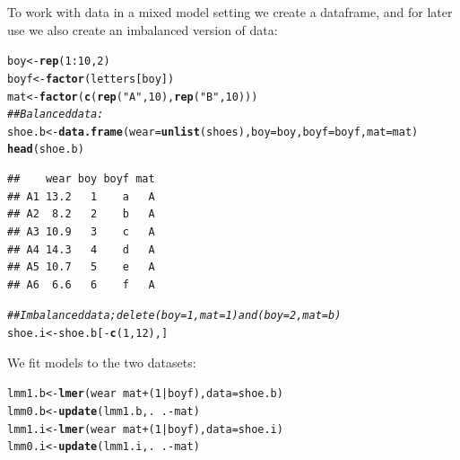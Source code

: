 \documentclass[11pt]{article}\usepackage[]{graphicx}\usepackage[]{xcolor}
\makeatletter
\newcommand{\hlnum}[1]{\textcolor[rgb]{0.686,0.059,0.569}{#1}}%
\newcommand{\hlstr}[1]{\textcolor[rgb]{0.192,0.494,0.8}{#1}}%
\newcommand{\hlcom}[1]{\textcolor[rgb]{0.678,0.584,0.686}{\textit{#1}}}%
\newcommand{\hlopt}[1]{\textcolor[rgb]{0,0,0}{#1}}%
\newcommand{\hlstd}[1]{\textcolor[rgb]{0.345,0.345,0.345}{#1}}%
\newcommand{\hlkwb}[1]{\textcolor[rgb]{0.69,0.353,0.396}{#1}}%
\newcommand{\hlkwc}[1]{\textcolor[rgb]{0.333,0.667,0.333}{#1}}%
\newcommand{\hlkwd}[1]{\textcolor[rgb]{0.737,0.353,0.396}{\textbf{#1}}}%
\newenvironment{kframe}{%
 \def\at@end@of@kframe{}%
 \ifinner\ifhmode%
  \def\at@end@of@kframe{\end{minipage}}%
  \begin{minipage}{\columnwidth}%
 \fi\fi%
 \def\FrameCommand##1{\hskip\@totalleftmargin \hskip-\fboxsep
 \colorbox{shadecolor}{##1}\hskip-\fboxsep
     \hskip-\linewidth \hskip-\@totalleftmargin \hskip\columnwidth}%
 \MakeFramed {\advance\hsize-\width
   \@totalleftmargin\z@ \linewidth\hsize
   \@setminipage}}%
 {\par\unskip\endMakeFramed%
 \at@end@of@kframe}
\newenvironment{knitrout}{}{} %
\makeatother
\begin{document}
To work with data in a mixed model setting we create a dataframe, and
for later use we also create an imbalanced version of data:

\begin{knitrout}
\color{fgcolor}\begin{kframe}
\begin{alltt}
\hlstd{boy} \hlkwb{<-} \hlkwd{rep}\hlstd{(}\hlnum{1}\hlopt{:}\hlnum{10}\hlstd{,} \hlnum{2}\hlstd{)}
\hlstd{boyf}\hlkwb{<-} \hlkwd{factor}\hlstd{(letters[boy])}
\hlstd{mat} \hlkwb{<-} \hlkwd{factor}\hlstd{(}\hlkwd{c}\hlstd{(}\hlkwd{rep}\hlstd{(}\hlstr{"A"}\hlstd{,} \hlnum{10}\hlstd{),} \hlkwd{rep}\hlstd{(}\hlstr{"B"}\hlstd{,} \hlnum{10}\hlstd{)))}
\hlcom{## Balanced data:}
\hlstd{shoe.b} \hlkwb{<-} \hlkwd{data.frame}\hlstd{(}\hlkwc{wear}\hlstd{=}\hlkwd{unlist}\hlstd{(shoes),} \hlkwc{boy}\hlstd{=boy,} \hlkwc{boyf}\hlstd{=boyf,} \hlkwc{mat}\hlstd{=mat)}
\hlkwd{head}\hlstd{(shoe.b)}
\end{alltt}
\begin{verbatim}
##    wear boy boyf mat
## A1 13.2   1    a   A
## A2  8.2   2    b   A
## A3 10.9   3    c   A
## A4 14.3   4    d   A
## A5 10.7   5    e   A
## A6  6.6   6    f   A
\end{verbatim}
\begin{alltt}
\hlcom{## Imbalanced data; delete (boy=1, mat=1) and (boy=2, mat=b)}
\hlstd{shoe.i} \hlkwb{<-}  \hlstd{shoe.b[}\hlopt{-}\hlkwd{c}\hlstd{(}\hlnum{1}\hlstd{,} \hlnum{12}\hlstd{),]}
\end{alltt}
\end{kframe}
\end{knitrout}

We fit models to the two datasets:

\begin{knitrout}
\color{fgcolor}\begin{kframe}
\begin{alltt}
\hlstd{lmm1.b}  \hlkwb{<-} \hlkwd{lmer}\hlstd{( wear} \hlopt{~} \hlstd{mat} \hlopt{+} \hlstd{(}\hlnum{1}\hlopt{|}\hlstd{boyf),} \hlkwc{data}\hlstd{=shoe.b)}
\hlstd{lmm0.b}  \hlkwb{<-} \hlkwd{update}\hlstd{(lmm1.b, .}\hlopt{~}\hlstd{.} \hlopt{-} \hlstd{mat)}
\hlstd{lmm1.i}  \hlkwb{<-} \hlkwd{lmer}\hlstd{(wear} \hlopt{~} \hlstd{mat} \hlopt{+} \hlstd{(}\hlnum{1}\hlopt{|}\hlstd{boyf),} \hlkwc{data}\hlstd{=shoe.i)}
\hlstd{lmm0.i}  \hlkwb{<-} \hlkwd{update}\hlstd{(lmm1.i, .}\hlopt{~}\hlstd{.} \hlopt{-} \hlstd{mat)}
\end{alltt}
\end{kframe}
\end{knitrout}
\end{document}
